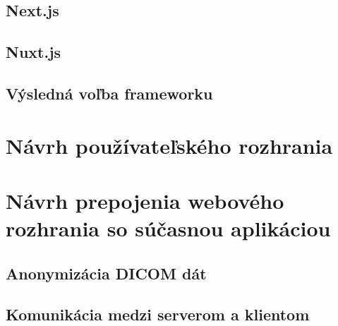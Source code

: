 
\subsection {Next.js}

\subsection {Nuxt.js}

\subsection {Výsledná voľba frameworku}

\section {Návrh používateľského rozhrania}


\section {Návrh prepojenia webového rozhrania so súčasnou aplikáciou}

\subsection {Anonymizácia DICOM dát}

\subsection {Komunikácia medzi serverom a klientom}

